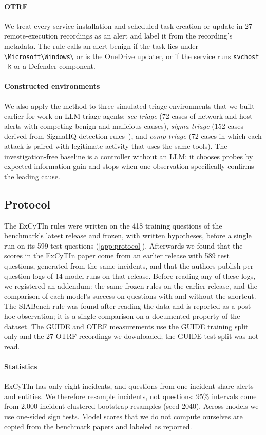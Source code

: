 \paragraph{OTRF} We treat every service installation and scheduled-task creation or update in 27 remote-execution recordings as an alert and label it from the recording's metadata. The rule calls an alert benign if the task lies under \texttt{\textbackslash Microsoft\textbackslash Windows\textbackslash} or is the OneDrive updater, or if the service runs \texttt{svchost -k} or a Defender component.

\paragraph{Constructed environments} We also apply the method to three simulated triage environments that we built earlier for work on LLM triage agents: \emph{sec-triage} (72 cases of network and host alerts with competing benign and malicious causes), \emph{sigma-triage} (152 cases derived from SigmaHQ detection rules~\citep{sigmahq}), and \emph{comp-triage} (72 cases in which each attack is paired with legitimate activity that uses the same tools). The investigation-free baseline is a controller without an LLM: it chooses probes by expected information gain and stops when one observation specifically confirms the leading cause.

\subsection{Protocol}
\label{sec:protocol}

The ExCyTIn rules were written on the 418 training questions of the benchmark's latest release and frozen, with written hypotheses, before a single run on its 599 test questions (\cref{app:protocol}). Afterwards we found that the scores in the ExCyTIn paper come from an earlier release with 589 test questions, generated from the same incidents, and that the authors publish per-question logs of 14 model runs on that release. Before reading any of these logs, we registered an addendum: the same frozen rules on the earlier release, and the comparison of each model's success on questions with and without the shortcut. The SIABench rule was found after reading the data and is reported as a post hoc observation; it is a single comparison on a documented property of the dataset. The GUIDE and OTRF measurements use the GUIDE training split only and the 27 OTRF recordings we downloaded; the GUIDE test split was not read.

\paragraph{Statistics} ExCyTIn has only eight incidents, and questions from one incident share alerts and entities. We therefore resample incidents, not questions: 95\% intervals come from 2{,}000 incident-clustered bootstrap resamples (seed 2040). Across models we use one-sided sign tests. Model scores that we do not compute ourselves are copied from the benchmark papers and labeled as reported.
